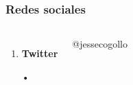 \documentclass{beamer}
\begin{document}
\begin{frame}
\frametitle{Redes sociales}
\begin{columns}[c] %

\begin{enumerate}
\item \textbf{Twitter}
\item[•]
\end{enumerate}

{\color{blue}@jessecogollo}
\end{columns}
\end{frame}
\end{document}
